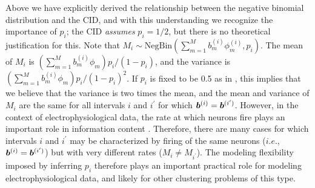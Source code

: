 \documentclass[journal]{IEEEtran}
\begin{document}
Above we have explicitly derived the relationship between the negative binomial distribution and the CID, and with this understanding we recognize the importance of $p_i$; the CID \emph{assumes} $p_i=1/2$, but there is no theoretical justification for this. Note that  $M_i\sim\mbox{NegBin}(\sum_{m=1}^M b_m^{(i)}{\phi}_m^{(i)},p_i)$. The mean of $M_i$ is $(\sum_{m=1}^M b_m^{(i)}{\phi}_m) p_i/(1-p_i)$, and the variance is $(\sum_{m=1}^M b_m^{(i)}{\phi}_m)p_i/(1-p_i)^2$. If $p_i$ is fixed to be  0.5 as in \cite{compound}, this implies that we believe that the variance is two times the mean, and the mean and variance of $M_i$ are the same for all intervals $i$ and $i^\prime$ for which $\boldsymbol{b}^{(i)}=\boldsymbol{b}^{(i^\prime)}$. However, in the context of electrophysiological data, the rate at which neurons fire plays an important role in information content \cite{Donoghue07}. Therefore, there are many cases for which intervals $i$ and $i^\prime$ may be characterized by firing of the same neurons ($i.e.$, $\boldsymbol{b}^{(i)}=\boldsymbol{b}^{(i^\prime)}$) but with very different rates ($M_i\neq M_{i^\prime}$). The modeling flexibility imposed by inferring $p_i$ therefore plays an important practical role for modeling electrophysiological data, and likely for other clustering problems of this type.

%
%
\end{document}
